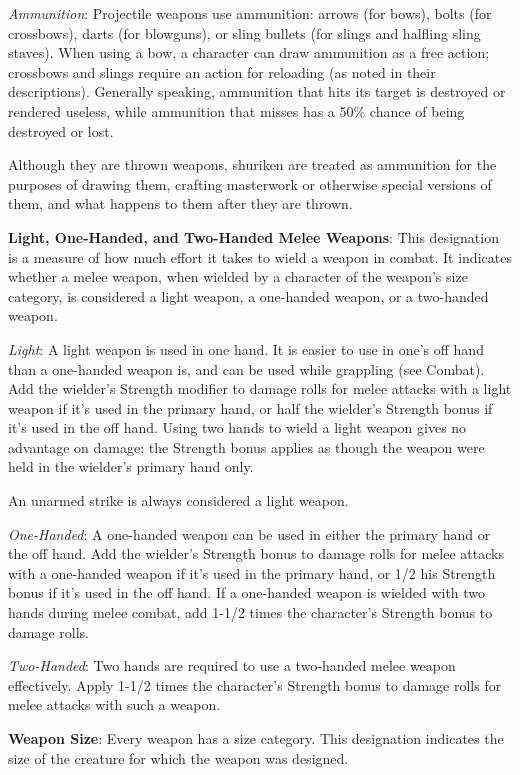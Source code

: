 \textit{Ammunition}: Projectile weapons use ammunition: arrows (for bows), bolts (for crossbows), darts (for blowguns), or sling bullets (for slings and halfling sling staves). When using a bow, a character can draw ammunition as a free action; crossbows and slings require an action for reloading (as noted in their descriptions). Generally speaking, ammunition that hits its target is destroyed or rendered useless, while ammunition that misses has a 50\% chance of being destroyed or lost.
		
Although they are thrown weapons, shuriken are treated as ammunition for the purposes of drawing them, crafting masterwork or otherwise special versions of them, and what happens to them after they are thrown.
		
\textbf{Light, One-Handed, and Two-Handed Melee Weapons}: This designation is a measure of how much effort it takes to wield a weapon in combat. It indicates whether a melee weapon, when wielded by a character of the weapon's size category, is considered a light weapon, a one-handed weapon, or a two-handed weapon.
		
\textit{Light}: A light weapon is used in one hand. It is easier to use in one's off hand than a one-handed weapon is, and can be used while grappling (see Combat). Add the wielder's Strength modifier to damage rolls for melee attacks with a light weapon if it's used in the primary hand, or half the wielder's Strength bonus if it's used in the off hand. Using two hands to wield a light weapon gives no advantage on damage; the Strength bonus applies as though the weapon were held in the wielder's primary hand only.
		
An unarmed strike is always considered a light weapon.
		
\textit{One-Handed}: A one-handed weapon can be used in either the primary hand or the off hand. Add the wielder's Strength bonus to damage rolls for melee attacks with a one-handed weapon if it's used in the primary hand, or 1/2 his Strength bonus if it's used in the off hand. If a one-handed weapon is wielded with two hands during melee combat, add 1-1/2 times the character's Strength bonus to damage rolls.
		
\textit{Two-Handed}: Two hands are required to use a two-handed melee weapon effectively. Apply 1-1/2 times the character's Strength bonus to damage rolls for melee attacks with such a weapon. 
		
\textbf{Weapon Size}: Every weapon has a size category. This designation indicates the size of the creature for which the weapon was designed.
		
